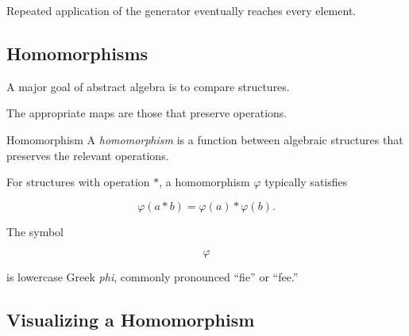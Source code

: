 Repeated application of the generator eventually reaches every element.

\subsection{Homomorphisms}
\label{subsec:homomorphisms}

A major goal of abstract algebra is to compare structures.

The appropriate maps are those that preserve operations.

\begin{definitionbox}{Homomorphism}
A \emph{homomorphism} is a function between algebraic structures that preserves
the relevant operations.
\end{definitionbox}

For structures with operation \(*\), a homomorphism \(\varphi\) typically
satisfies

\[ \varphi(a*b)=\varphi(a)*\varphi(b). \]

The symbol

\[ \varphi \]

is lowercase Greek \emph{phi}, commonly pronounced ``fie'' or ``fee.''

\subsection{Visualizing a Homomorphism}
\label{subsec:visual-homomorphism}

\begin{center}
\end{center}


